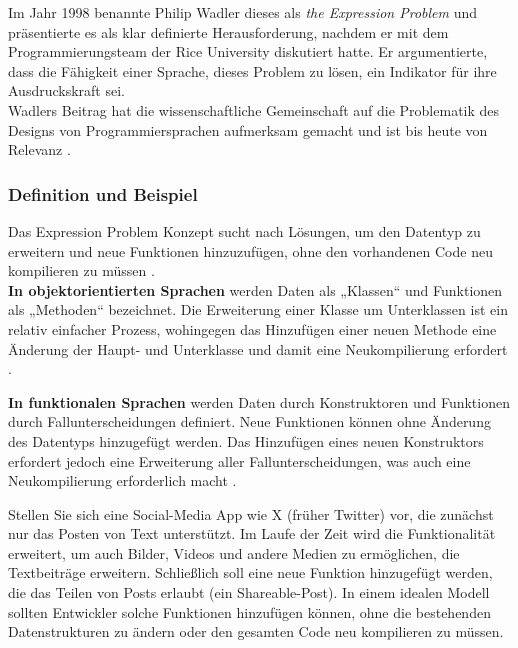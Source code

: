 \documentclass{easychair}
\begin{document}
Im Jahr 1998 benannte Philip Wadler dieses als \textit{the Expression Problem} und präsentierte es als klar definierte Herausforderung, nachdem er mit dem Programmierungsteam der Rice University diskutiert hatte. Er argumentierte, dass die Fähigkeit einer Sprache, dieses Problem zu lösen, ein Indikator für ihre Ausdruckskraft sei. \\
Wadlers Beitrag hat die wissenschaftliche Gemeinschaft auf die Problematik des Designs von Programmiersprachen aufmerksam gemacht und ist bis heute von Relevanz \cite{wadler1998expression}.

  \subsubsection{Definition und Beispiel}
  Das Expression Problem Konzept sucht nach Lösungen, um den Datentyp zu erweitern und neue Funktionen hinzuzufügen, ohne den vorhandenen Code neu kompilieren zu müssen \cite{wadler1998expression}.\\

  \textbf{In objektorientierten Sprachen} werden Daten als „Klassen“ und Funktionen als „Methoden“ bezeichnet. Die Erweiterung einer Klasse um Unterklassen ist ein relativ einfacher Prozess, wohingegen das Hinzufügen einer neuen Methode eine Änderung der Haupt- und Unterklasse und damit eine Neukompilierung erfordert \cite{gamma1994design}.

  \textbf{In funktionalen Sprachen} werden Daten durch Konstruktoren und Funktionen durch Fallunterscheidungen definiert. Neue Funktionen können ohne Änderung des Datentyps hinzugefügt werden. Das Hinzufügen eines neuen Konstruktors erfordert jedoch eine Erweiterung aller Fallunterscheidungen, was auch eine Neukompilierung erforderlich macht \cite{hughes1989functional}.
  
  \begin{tcolorbox}[colframe=black, title=Beispiel 1: Ein Hauptbeispiel für das Verständnis dieses Konzepts, label={beispiel1}]
    \hypertarget{beispiel1}{Stellen Sie sich eine Social-Media App wie X (früher Twitter) vor, die zunächst nur das Posten von Text unterstützt. Im Laufe der Zeit wird die Funktionalität erweitert, um auch Bilder, Videos und andere Medien zu ermöglichen, die Textbeiträge erweitern. Schließlich soll eine neue Funktion hinzugefügt werden, die das Teilen von Posts erlaubt (ein Shareable-Post). In einem idealen Modell sollten Entwickler solche Funktionen hinzufügen können, ohne die bestehenden Datenstrukturen zu ändern oder den gesamten Code neu kompilieren zu müssen.}
  \end{tcolorbox}
\end{document}
